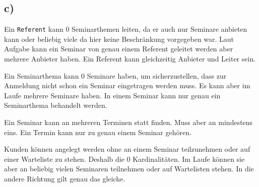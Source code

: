 \documentclass[10pt,a4paper]{report}
\begin{document}
\subsection{c)}

Ein \texttt{Referent} kann 0 Seminarthemen leiten, da er auch nur Seminare anbieten kann oder beliebig viele da hier keine Beschränkung vorgegeben war. 
Laut Aufgabe kann ein Seminar von genau einem Referent geleitet werden aber mehrere Anbieter haben. Ein Referent kann gleichzeitig Anbieter und Leiter sein.

Ein Seminarthema kann 0 Seminare haben, um sicherzustellen, dass zur Anmeldung nicht schon ein Seminar eingetragen werden muss. Es kann aber im Laufe mehrere Seminare haben.
In einem Seminar kann nur genau ein Seminarthema behandelt werden.

Ein Seminar kann an mehreren Terminen statt finden. Muss aber an mindestens eins. Ein Termin kann nur zu genau einem Seminar gehören.

Kunden können angelegt werden ohne an einem Seminar teilzunehmen oder auf einer Warteliste zu stehen. Deshalb die 0 Kardinalitäten. Im Laufe können sie aber an beliebig vielen Seminaren teilnehmen oder auf Wartelisten stehen. In die andere Richtung gilt genau das gleiche.
\end{document}

